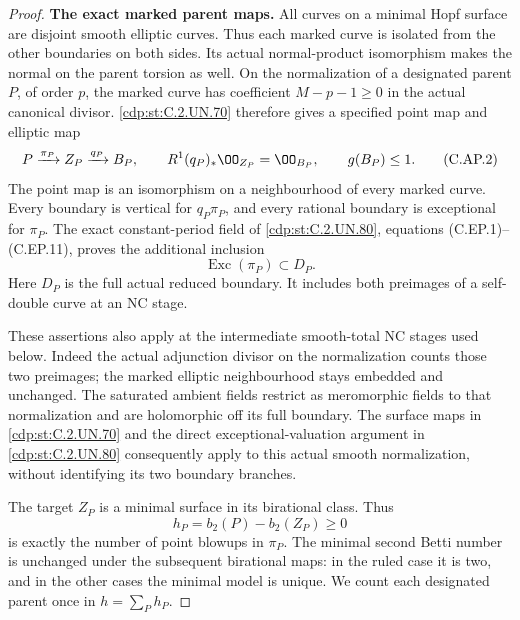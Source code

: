 \begin{proof}
\par\medskip\noindent\textbf{The exact marked parent maps.}
All curves on a minimal Hopf surface are disjoint smooth
elliptic curves. Thus each marked curve is isolated from
the other boundaries on both sides. Its actual normal-product
isomorphism makes the normal on the parent torsion as well.
On the normalization of a designated parent \(P\), of order
\(p\), the marked curve has coefficient
\(M-p-1\ge0\) in the actual canonical divisor. \ref{cdp:st:C.2.UN.70} therefore
gives a specified point map and elliptic map
\[
 P\xrightarrow{\pi_P} Z_P\xrightarrow{q_P}B_P,
 \qquad R^1(q_P)_*\OO_{Z_P}=\OO_{B_P},
 \qquad g(B_P)\le1.
 \tag{C.AP.2}\label{cdp:eq:C.AP.2}
\]
The point map is an isomorphism on a neighbourhood of every
marked curve. Every boundary is vertical for \(q_P\pi_P\),
and every rational boundary is exceptional for \(\pi_P\).
The exact constant-period field of \ref{cdp:st:C.2.UN.80}, equations
(C.EP.1)--(C.EP.11), proves the additional inclusion
\[
                 \operatorname{Exc}(\pi_P)\subset D_P.
 \tag{C.AP.3}\label{cdp:eq:C.AP.3}
\]
Here \(D_P\) is the full actual reduced boundary. It includes
both preimages of a self-double curve at an NC stage.

These assertions also apply at the intermediate smooth-total
NC stages used below. Indeed the actual adjunction divisor
on the normalization counts those two preimages; the marked
elliptic neighbourhood stays embedded and unchanged. The
saturated ambient fields restrict as meromorphic fields to
that normalization and are holomorphic off its full boundary.
The surface maps in \ref{cdp:st:C.2.UN.70} and the direct exceptional-valuation
argument in \ref{cdp:st:C.2.UN.80} consequently apply to this actual smooth
normalization, without identifying its two boundary branches.

The target \(Z_P\) is a minimal surface in its birational
class. Thus
\[
 h_P=b_2(P)-b_2(Z_P)\ge0
 \tag{C.AP.4}\label{cdp:eq:C.AP.4}
\]
is exactly the number of point blowups in \(\pi_P\). The
minimal second Betti number is unchanged under the subsequent
birational maps: in the ruled case it is two, and in the
other cases the minimal model is unique. We count each
designated parent once in \(h=\sum_P h_P\).


\end{proof}
